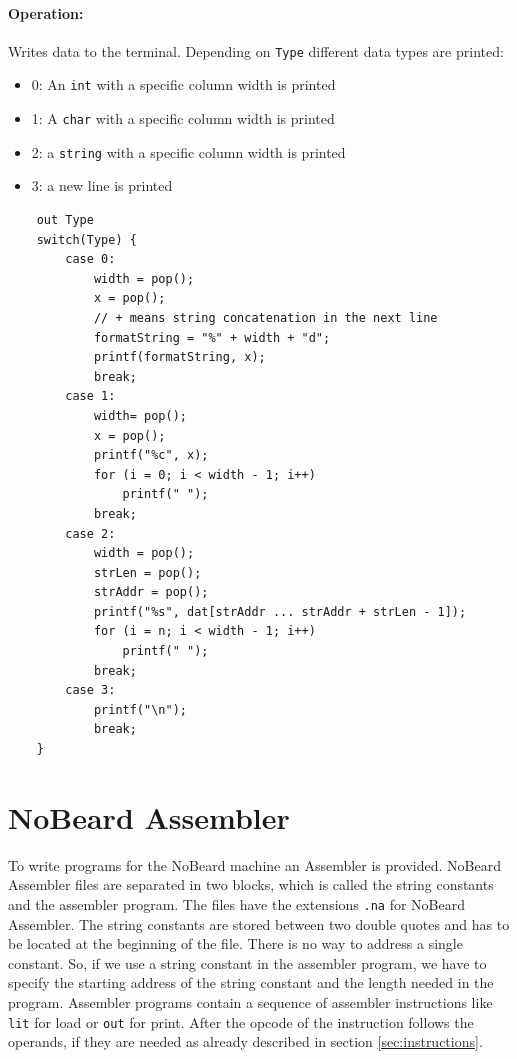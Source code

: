 \paragraph{Operation:}
Writes data to the terminal. Depending on \lstinline$Type$ different data types are printed:

\begin{itemize}
	\item 0: An \lstinline$int$ with a specific column width is printed
	\item 1: A \lstinline$char$ with a specific column width is printed
	\item 2: a \lstinline$string$ with a specific column width is printed
	\item 3: a new line is printed
\end{itemize}

	\begin{lstlisting}
	out Type
	switch(Type) {
		case 0:
			width = pop();
			x = pop();
			// + means string concatenation in the next line
			formatString = "%" + width + "d";
			printf(formatString, x);
			break;
		case 1:
			width= pop();
			x = pop();
			printf("%c", x);
			for (i = 0; i < width - 1; i++)
				printf(" ");
			break;
		case 2:
			width = pop();
			strLen = pop();
			strAddr = pop();
			printf("%s", dat[strAddr ... strAddr + strLen - 1]);
			for (i = n; i < width - 1; i++)
				printf(" ");
			break;
		case 3:
			printf("\n");
			break;
	}
	\end{lstlisting}
	
\section{NoBeard Assembler}
To write programs for the NoBeard machine an Assembler is provided. NoBeard Assembler files are separated in two blocks, which is called the string constants and the assembler program. The files have the extensions \lstinline$.na$ for NoBeard Assembler. The string constants are stored between two double quotes and has to be located at the beginning of the file. There is no way to address a single constant. So, if we use a string constant in the assembler program, we have to specify the starting address of the string constant and the length needed in the program. Assembler programs  contain a sequence of assembler instructions like \lstinline$lit$ for load or \lstinline$out$ for print. After the opcode of the instruction follows the operands, if they are needed as already described in section \ref{sec:instructions}.